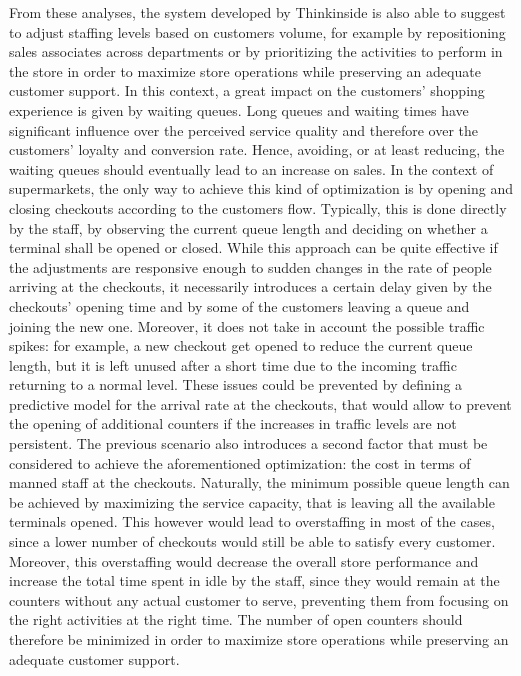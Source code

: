 From these analyses, the system developed by Thinkinside is also able to suggest to adjust staffing levels based on customers volume, for example by repositioning sales associates across departments or by prioritizing the activities to perform in the store in order to maximize store operations while preserving an adequate customer support. In this context, a great impact on the customers’ shopping experience is given by waiting queues. Long queues and waiting times have significant influence over the perceived service quality and therefore over the customers’ loyalty and conversion rate. Hence, avoiding, or at least reducing, the waiting queues should eventually lead to an increase on sales. In the context of supermarkets, the only way to achieve this kind of optimization is by opening and closing checkouts according to the customers flow. Typically, this is done directly by the staff, by observing the current queue length and deciding on whether a terminal shall be opened or closed. While this approach can be quite effective if the adjustments are responsive enough to sudden changes in the rate of people arriving at the checkouts, it necessarily introduces a certain delay given by the checkouts’ opening time and by some of the customers leaving a queue and joining the new one. Moreover, it does not take in account the possible traffic spikes: for example, a new checkout get opened to reduce the current queue length, but it is left unused after a short time due to the incoming traffic returning to a normal level. These issues could be prevented by defining a predictive model for the arrival rate at the checkouts, that would allow to prevent the opening of additional counters if the increases in traffic levels are not persistent. The previous scenario also introduces a second factor that must be considered to achieve the aforementioned optimization: the cost in terms of manned staff at the checkouts. Naturally, the minimum possible queue length can be achieved by maximizing the service capacity, that is leaving all the available terminals opened. This however would lead to overstaffing in most of the cases, since a lower number of checkouts would still be able to satisfy every customer. Moreover, this overstaffing would decrease the overall store performance and increase the total time spent in idle by the staff, since they would remain at the counters without any actual customer to serve, preventing them from focusing on the right activities at the right time. The number of open counters should therefore be minimized in order to maximize store operations while preserving an adequate customer support.


